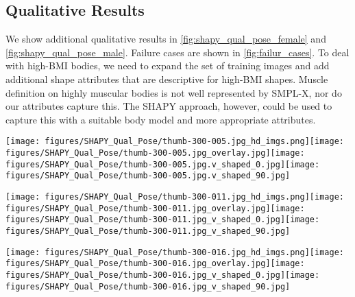 \documentclass[10pt,twocolumn,letterpaper]{article}
\newcommand{\modelCOLOR}{black}
\newcommand{\modelname}{{\color{\modelCOLOR}SHAPY}\xspace}
\newcommand{\smplx}{\mbox{SMPL-X}\xspace}
\begin{document}
\begin{appendices}
\subsection{Qualitative Results}
We show additional qualitative results in \cref{fig:shapy_qual_pose_female} and \cref{fig:shapy_qual_pose_male}. Failure cases are shown in \cref{fig:failur_cases}.
To deal with high-BMI bodies, we need to expand the set of training images and add additional shape attributes that are descriptive for high-BMI shapes.
Muscle definition on highly muscular bodies is not well represented by \smplx, nor do our attributes capture this.
The \modelname approach, however, could be used to capture this with a suitable
body model and more appropriate attributes.

 
\begin{figure*}[th]
    \centering
    \texttt{[image: figures/SHAPY\_Qual\_Pose/thumb-300-005.jpg\_hd\_imgs.png]}\texttt{[image: figures/SHAPY\_Qual\_Pose/thumb-300-005.jpg\_overlay.jpg]}\texttt{[image: figures/SHAPY\_Qual\_Pose/thumb-300-005.jpg.v\_shaped\_0.jpg]}\texttt{[image: figures/SHAPY\_Qual\_Pose/thumb-300-005.jpg.v\_shaped\_90.jpg]}
    
    \texttt{[image: figures/SHAPY\_Qual\_Pose/thumb-300-011.jpg\_hd\_imgs.png]}\texttt{[image: figures/SHAPY\_Qual\_Pose/thumb-300-011.jpg\_overlay.jpg]}\texttt{[image: figures/SHAPY\_Qual\_Pose/thumb-300-011.jpg\_v\_shaped\_0.jpg]}\texttt{[image: figures/SHAPY\_Qual\_Pose/thumb-300-011.jpg\_v\_shaped\_90.jpg]}
    
    \texttt{[image: figures/SHAPY\_Qual\_Pose/thumb-300-016.jpg\_hd\_imgs.png]}\texttt{[image: figures/SHAPY\_Qual\_Pose/thumb-300-016.jpg\_overlay.jpg]}\texttt{[image: figures/SHAPY\_Qual\_Pose/thumb-300-016.jpg\_v\_shaped\_0.jpg]}\texttt{[image: figures/SHAPY\_Qual\_Pose/thumb-300-016.jpg\_v\_shaped\_90.jpg]}
    

\end{figure*}
\end{appendices}
\end{document}
